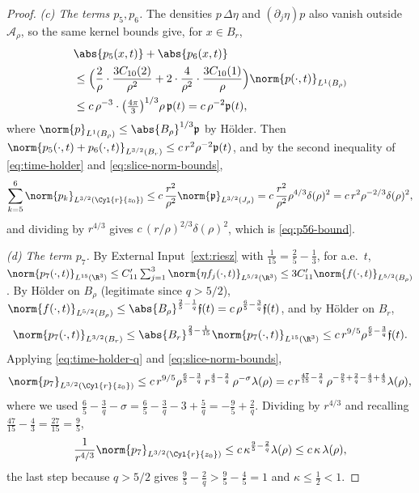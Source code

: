 \documentclass[11pt,reqno]{amsart}
\begin{document}
\begin{proof}
\emph{(c) The terms $p_{5},p_{6}$.} The densities $p\,\Delta\eta$ and
$(\partial_{j}\eta)p$ also vanish outside $\mathcal{A}_{\rho}$, so the same kernel
bounds give, for $x\in B_{r}$,
\[
\begin{aligned}
&\abs{p_{5}(x,t)}+\abs{p_{6}(x,t)}
\\ &\le\Bigl(\frac2\rho\cdot\frac{3C_{10}(2)}{\rho^{2}}
     +2\cdot\frac{4}{\rho^{2}}\cdot\frac{3C_{10}(1)}{\rho}\Bigr)
     \norm{p(\cdot,t)}_{L^{1}(B_{\rho})}
\\ &\le c\,\rho^{-3}\cdot\bigl(\tfrac{4\pi}{3}\bigr)^{1/3}\rho\,\mathfrak{p}(t)
  = c\,\rho^{-2}\mathfrak{p}(t),
\end{aligned}
\]
where $\norm{p}_{L^{1}(B_{\rho})}\le\abs{B_{\rho}}^{1/3}\mathfrak{p}$ by
H\"older. Then
$\norm{p_{5}(\cdot,t)+p_{6}(\cdot,t)}_{L^{3/2}(B_{r})}
 \le c\,r^{2}\rho^{-2}\mathfrak{p}(t)$, and by the second inequality of
\eqref{eq:time-holder} and \eqref{eq:slice-norm-bounds},
\[
  \sum_{k=5}^{6}\norm{p_{k}}_{L^{3/2}(\Cyl{r}{z_{0}})}
  \le c\,\frac{r^{2}}{\rho^{2}}\norm{\mathfrak{p}}_{L^{3/2}(J_{\rho})}
  = c\,\frac{r^{2}}{\rho^{2}}\rho^{4/3}\delta(\rho)^{2}
  = c\,r^{2}\rho^{-2/3}\delta(\rho)^{2} ,
\]
and dividing by $r^{4/3}$ gives $c\,(r/\rho)^{2/3}\delta(\rho)^{2}$, which is
\eqref{eq:p56-bound}.

\emph{(d) The term $p_{7}$.} By External Input~\ref{ext:riesz} with
$\tfrac1{15}=\tfrac25-\tfrac13$, for a.e.\ $t$,
$\norm{p_{7}(\cdot,t)}_{L^{15}(\R^{3})}
 \le C'_{11}\sum_{j=1}^{3}\norm{\eta f_j(\cdot,t)}_{L^{5/2}(\R^{3})}
 \le 3C'_{11}\norm{f(\cdot,t)}_{L^{5/2}(B_{\rho})}$. By H\"older on $B_{\rho}$
(legitimate since $q>5/2$),
$\norm{f(\cdot,t)}_{L^{5/2}(B_{\rho})}
 \le\abs{B_{\rho}}^{\frac25-\frac1q}\mathfrak{f}(t)
 = c\,\rho^{\frac65-\frac3q}\mathfrak{f}(t)$, and by H\"older on $B_{r}$,
\[
  \norm{p_{7}(\cdot,t)}_{L^{3/2}(B_{r})}
  \le\abs{B_{r}}^{\frac23-\frac1{15}}\norm{p_{7}(\cdot,t)}_{L^{15}(\R^{3})}
  \le c\,r^{9/5}\rho^{\frac65-\frac3q}\mathfrak{f}(t).
\]
Applying \eqref{eq:time-holder-q} and \eqref{eq:slice-norm-bounds},
\[
  \norm{p_{7}}_{L^{3/2}(\Cyl{r}{z_{0}})}
  \le c\,r^{9/5}\rho^{\frac65-\frac3q}\,r^{\frac43-\frac2q}\,
       \rho^{-\sigma}\lambda(\rho)
  = c\,r^{\frac{47}{15}-\frac2q}\,\rho^{-\frac95+\frac2q-\frac43+\frac43}
       \lambda(\rho),
\]
where we used $\tfrac65-\tfrac3q-\sigma=\tfrac65-\tfrac3q-3+\tfrac5q
=-\tfrac95+\tfrac2q$. Dividing by $r^{4/3}$ and recalling
$\tfrac{47}{15}-\tfrac43=\tfrac{27}{15}=\tfrac95$,
\[
  \frac{1}{r^{4/3}}\norm{p_{7}}_{L^{3/2}(\Cyl{r}{z_{0}})}
  \le c\,\kappa^{\frac95-\frac2q}\lambda(\rho)\le c\,\kappa\,\lambda(\rho),
\]
the last step because $q>5/2$ gives $\tfrac95-\tfrac2q>\tfrac95-\tfrac45=1$ and
$\kappa\le\tfrac12<1$.


\end{proof}
\end{document}
